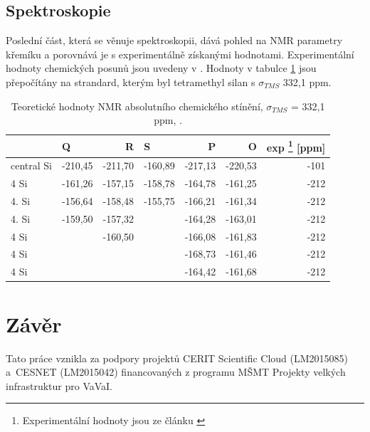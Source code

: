 \documentclass[
  digital, %
  table,   %
  lof,     %
  lot,     %
  oneside,
]{fithesis3}
\begin{document}
\section{Spektroskopie}
 Poslední část, která se věnuje spektroskopii, dává pohled na NMR parametry křemíku a porovnává je s experimentálně získanými hodnotami. Experimentální hodnoty chemických posunů jsou uvedeny v \cite{1316862}. Hodnoty v tabulce \ref{nmr} jsou přepočítány na strandard, kterým byl tetramethyl silan s $\sigma_{TMS}$ 332,1 ppm.

\begin{table}[htbp]
\begin{minipage}{\textwidth}
\caption{Teoretické hodnoty NMR absolutního chemického stínění, $\sigma_{TMS}$ = 332,1 ppm,   \cite{1316862}.}
\begin{center}
\begin{tabular}{|l|l|r|l|r|r|r|}
\hline
\label{nmr} & \textbf{Q} & \textbf{R} &\textbf{S} & \textbf{P} & \textbf{O} & {exp \footnote{Experimentální hodnoty jsou ze článku \cite{1316862}} [ppm]} \\ \hline
central Si & \multicolumn{1}{r|}{-210,45} & -211,70 & \multicolumn{1}{r|}{-160,89} & -217,13 & -220,53 & -101 \\ \hline
4 Si & \multicolumn{1}{r|}{-161,26} & -157,15 & \multicolumn{1}{r|}{-158,78} & -164,78 & -161,25 & -212 \\ \hline
4. Si & \multicolumn{1}{r|}{-156,64} & -158,48 & \multicolumn{1}{r|}{-155,75} & -166,21 & -161,34 & -212 \\ \hline
4. Si & \multicolumn{1}{r|}{-159,50} & -157,32 &  & -164,28 & -163,01 & -212 \\ \hline
4 Si &  & -160,50 &  & -166,08 & -161,83 & -212 \\ \hline
4 Si &  & \multicolumn{1}{l|}{} &  & -168,73 & -161,46 & -212 \\ \hline
4 Si &  & \multicolumn{1}{l|}{} &  & -164,42 & -161,68 & -212 \\ \hline
\end{tabular}
\end{center}
\end{minipage}
\end{table}












\chapter{Závěr}
 Tato práce vznikla za podpory projektů CERIT Scientific Cloud (LM2015085) a~CESNET (LM2015042) financovaných z programu MŠMT Projekty velkých infrastruktur pro VaVaI.
\newpage
\end{document}
